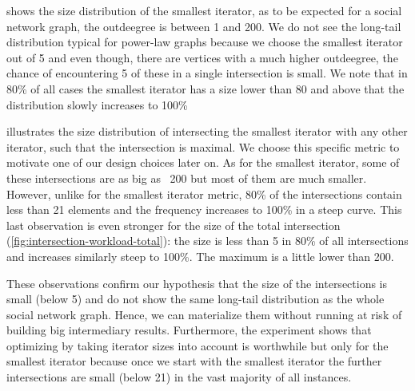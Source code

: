  shows the size distribution of the smallest iterator, as to be expected for a social network
graph, the outdeegree is between 1 and 200.
We do not see the long-tail distribution typical for power-law graphs because we choose the smallest iterator out of 5 and even
though, there are vertices with a much higher outdeegree, the chance of encountering 5 of these in a single intersection is small.
We note that in 80\% of all cases the smallest iterator has a size lower than 80 and above that the distribution slowly increases to 100\%

 illustrates the size distribution of intersecting the smallest iterator with any other
iterator, such that the intersection is maximal.
We choose this specific metric to motivate one of our design choices later on.
As for the smallest iterator, some of these intersections are as big as ~200 but most of them are much smaller.
However, unlike for the smallest iterator metric, 80\% of the intersections contain less than 21  elements and the frequency increases to
100\% in a steep curve.
This last observation is even stronger for the size of the total intersection (\cref{fig:intersection-workload-total}):
the size is less than 5 in 80\% of all intersections and increases similarly steep to 100\%.
The maximum is a little lower than 200.

These observations confirm our hypothesis that the size of the intersections is small (below 5) and do not show the same long-tail
distribution as the whole social network graph.
Hence, we can materialize them without running at risk of building big intermediary results.
Furthermore, the experiment shows that optimizing by taking iterator sizes into account is worthwhile but only for the smallest iterator
because
once we start with the smallest iterator the further intersections are small (below 21) in the vast majority of all instances.


